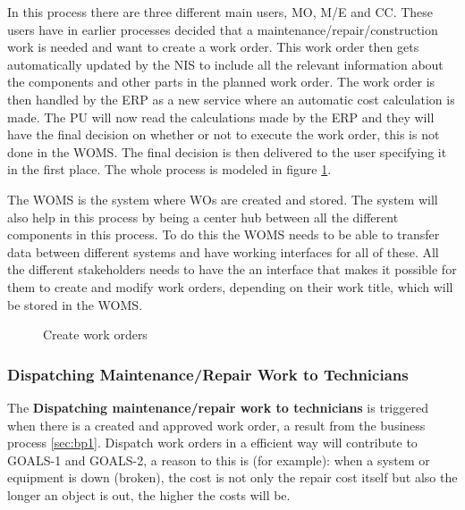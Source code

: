 In this process there are three different main users, MO, M/E and CC. These users have in earlier processes decided that a maintenance/repair/construction work is needed and want to create a work order. This work order then gets automatically updated by the NIS to include all the relevant information about the components and other parts in the planned work order. The work order is then handled by the ERP as a new service where an automatic cost calculation is made. The PU will now read the calculations made by the ERP and they will have the final decision on whether or not to execute the work order, this is not done in the WOMS. The final decision is then delivered to the user specifying it in the first place. The whole process is modeled in figure \ref{fig:create}.

The WOMS is the system where WOs are created and stored. The system will also help in this process by being a center hub between all the different components in this process. To do this the WOMS needs to be able to transfer data between different systems and have working interfaces for all of these. All the different stakeholders needs to have the an interface that makes it possible for them to create and modify work orders, depending on their work title, which will be stored in the WOMS.
\begin{figure}[H]
	\centering
	\setlength\fboxsep{7pt}
	\setlength\fboxrule{0.5pt}
	\label{fig:create}
	\caption{Create work orders}
\end{figure}
%
\subsubsection{Dispatching Maintenance/Repair Work to Technicians}
\label{sec:bp3}
The \textbf{Dispatching maintenance/repair work to technicians} is triggered when there is a created and approved work order, a result from the business process \ref{sec:bp1}. Dispatch work orders in a efficient way will contribute to GOALS-1 and GOALS-2, a reason to this is (for example): when a system or equipment is down (broken), the cost is not only the repair cost itself but also the longer an object is out, the higher the costs will be.

